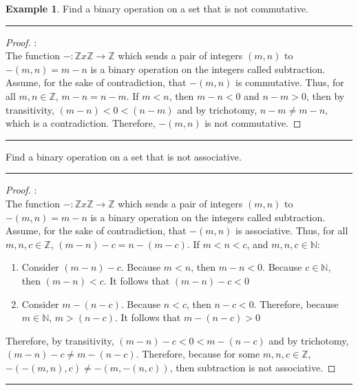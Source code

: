 \documentclass[openany, amssymb, psamsfonts]{amsart}
\newcommand{\bbN}{\mathbb{N}}
\newcommand{\bbZ}{\mathbb{Z}}
\newcommand{\arr}{\longrightarrow}
\theoremstyle{definition}
\newtheorem{exmp}{Example}[section]
\numberwithin{equation}{section}
\begin{document}
\begin{exmp}
    Find a binary operation on a set that is not commutative.
     \vspace{4pt}     \hrule   \vspace{4pt} \begin{proof}:\\
 The function $-\colon \bbZ x \bbZ \arr \bbZ$ which sends a pair of integers $(m,n)$ to $-(m,n) = m-n$ is a binary operation on the integers called subtraction. Assume, for the sake of contradiction, that $-(m,n)$ is commutative. Thus, for all $m,n \in \bbZ$, $m-n = n-m$. If $m<n$, then $m-n< 0$ and $n-m >0$, then by transitivity, $(m-n) <0 < (n-m)$ and by trichotomy, $n-m\neq m-n$, which is a contradiction. Therefore, $-(m,n)$ is not commutative. 
\end{proof}		
\vspace{4pt}     \hrule   \vspace{4pt}
    Find a binary operation on a set that is not associative.
         \vspace{4pt}     \hrule   \vspace{4pt} \begin{proof}:\\
 The function $-\colon \bbZ x \bbZ \arr \bbZ$ which sends a pair of integers $(m,n)$ to $-(m,n) = m-n$ is a binary operation on the integers called subtraction. Assume, for the sake of contradiction, that $-(m,n)$ is associative. Thus, for all $m,n,c \in \bbZ$, $(m-n) -c = n-(m-c)$. If $m<n<c$, and $m,n,c\in \bbN$:
 \begin{enumerate}
     \item Consider $(m-n)-c$. Because $m<n$, then $m-n<0$. Because $c\in \bbN$, then $(m-n)<c$. It follows that $(m-n)-c<0$
     \item Consider $m-(n-c)$. Because $n<c$, then $n-c <0$. Therefore, because $m\in \bbN$, $m>(n-c)$. It follows that $m-(n-c)>0$
 \end{enumerate} 
 Therefore, by transitivity, $(m-n)-c<0<m-(n-c)$ and by trichotomy, $(m-n)-c \neq m-(n-c)$. Therefore, because for some $m,n,c \in \bbZ$, $-(-(m,n),c) \neq -(m,-(n,c))$, then subtraction is not associative. 
\end{proof}		
\vspace{4pt}     \hrule   \vspace{4pt}
\end{exmp}
\end{document}
